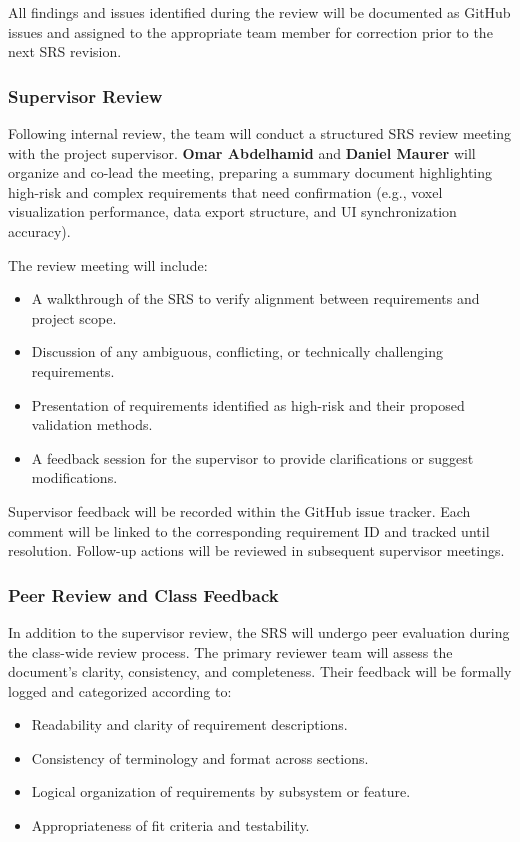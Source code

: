 \documentclass[12pt, titlepage]{article}
\begin{document}
All findings and issues identified during the review will be documented as GitHub issues and assigned to the appropriate team member for correction prior to the next SRS revision.

\subsubsection{Supervisor Review}

Following internal review, the team will conduct a structured SRS review meeting with the project supervisor. \textbf{Omar Abdelhamid} and \textbf{Daniel Maurer} will organize and co-lead the meeting, preparing a summary document highlighting high-risk and complex requirements that need confirmation (e.g., voxel visualization performance, data export structure, and UI synchronization accuracy).

The review meeting will include:

\begin{itemize}
  \item A walkthrough of the SRS to verify alignment between requirements and project scope.
  \item Discussion of any ambiguous, conflicting, or technically challenging requirements.
  \item Presentation of requirements identified as high-risk and their proposed validation methods.
  \item A feedback session for the supervisor to provide clarifications or suggest modifications.
\end{itemize}

Supervisor feedback will be recorded within the GitHub issue tracker. Each comment will be linked to the corresponding requirement ID and tracked until resolution. Follow-up actions will be reviewed in subsequent supervisor meetings.

\subsubsection{Peer Review and Class Feedback}

In addition to the supervisor review, the SRS will undergo peer evaluation during the class-wide review process. The primary reviewer team will assess the document’s clarity, consistency, and completeness. Their feedback will be formally logged and categorized according to:

\begin{itemize}
  \item Readability and clarity of requirement descriptions.
  \item Consistency of terminology and format across sections.
  \item Logical organization of requirements by subsystem or feature.
  \item Appropriateness of fit criteria and testability.
\end{itemize}
\end{document}
